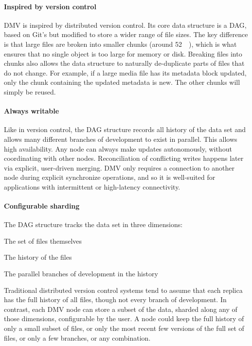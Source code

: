 

\paragraph{Inspired by version control}

DMV is inspired by distributed version control. Its core data structure is a
DAG, based on Git's but modified to store a wider range of file sizes. The key
difference is that large files are broken into smaller chunks (around
\SI{52}{\kibi\byte}), which is what ensures that no single object is too large
for memory or disk. Breaking files into chunks also allows the data structure to
naturally de-duplicate parts of files that do not change. For example, if a
large media file has its metadata block updated, only the chunk containing the
updated metadata is new. The other chunks will simply be reused.


\paragraph{Always writable}

Like in version control, the DAG structure records all history of the data set
and allows many different branches of development to exist in parallel. This
allows high availability. Any node can always make updates autonomously, without
coordinating with other nodes. Reconciliation of conflicting writes happens
later via explicit, user-driven merging. DMV only requires a connection to
another node during explicit synchronize operations, and so it is well-suited
for applications with intermittent or high-latency connectivity.


\paragraph{Configurable sharding}

The DAG structure tracks the data set in three dimensions:

\begin{tight_enumerate}
    \item The set of files themselves
    \item The history of the files
    \item The parallel branches of development in the history
\end{tight_enumerate}

Traditional distributed version control systems tend to assume that each replica
has the full history of all files, though not every branch of development. In
contrast, each DMV node can store a subset of the data, sharded along any of
those dimensions, configurable by the user. A node could keep the full history
of only a small subset of files, or only the most recent few versions of the
full set of files, or only a few branches, or any combination. 


